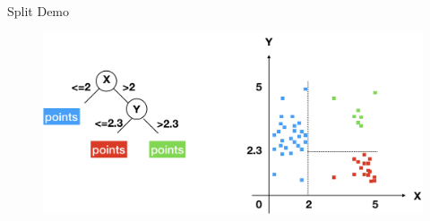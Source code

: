 \documentclass[shortpres]{beamer}
\begin{document}
        \begin{frame}{Split Demo}
          \begin{figure}
            \includegraphics[height=0.65\textheight]{fig/split3}
          \end{figure}
        \end{frame}
  
\end{document}
